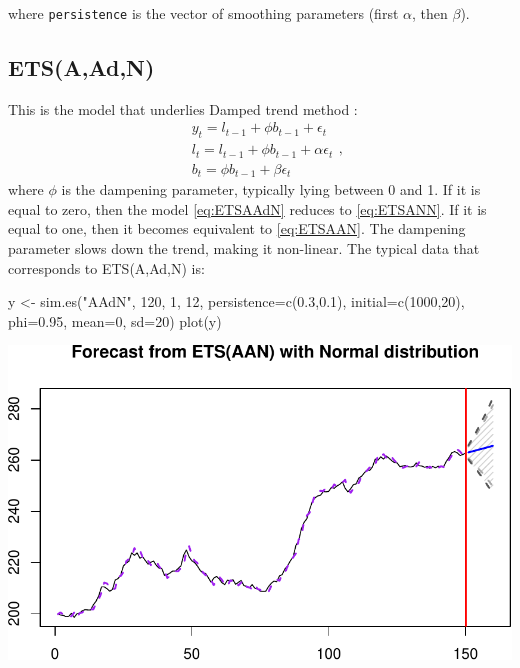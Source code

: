 \documentclass[
]{book}
\newenvironment{Shaded}{\begin{snugshade}}{\end{snugshade}}
\newcommand{\AttributeTok}[1]{\textcolor[rgb]{0.77,0.63,0.00}{#1}}
\newcommand{\DecValTok}[1]{\textcolor[rgb]{0.00,0.00,0.81}{#1}}
\newcommand{\FloatTok}[1]{\textcolor[rgb]{0.00,0.00,0.81}{#1}}
\newcommand{\FunctionTok}[1]{\textcolor[rgb]{0.00,0.00,0.00}{#1}}
\newcommand{\NormalTok}[1]{#1}
\newcommand{\OtherTok}[1]{\textcolor[rgb]{0.56,0.35,0.01}{#1}}
\newcommand{\StringTok}[1]{\textcolor[rgb]{0.31,0.60,0.02}{#1}}
\theoremstyle{definition}
\theoremstyle{definition}
\theoremstyle{definition}
\theoremstyle{definition}
\theoremstyle{remark}
\begin{document}
where \texttt{persistence} is the vector of smoothing parameters (first \(\alpha\), then \(\beta\)).

\hypertarget{ETSAAdN}{%
\subsection{ETS(A,Ad,N)}\label{ETSAAdN}}

This is the model that underlies Damped trend method \citep{Roberts1982}:
\begin{equation}
  \begin{aligned}
    & y_{t} = l_{t-1} + \phi b_{t-1} + \epsilon_t \\
    & l_t = l_{t-1} + \phi b_{t-1} + \alpha \epsilon_t \\
    & b_t = \phi b_{t-1} + \beta \epsilon_t
  \end{aligned} ,
  \label{eq:ETSAAdN}
\end{equation}
where \(\phi\) is the dampening parameter, typically lying between 0 and 1. If it is equal to zero, then the model \eqref{eq:ETSAAdN} reduces to \eqref{eq:ETSANN}. If it is equal to one, then it becomes equivalent to \eqref{eq:ETSAAN}. The dampening parameter slows down the trend, making it non-linear. The typical data that corresponds to ETS(A,Ad,N) is:

\begin{Shaded}
\begin{Highlighting}[]
\NormalTok{y }\OtherTok{\textless{}{-}} \FunctionTok{sim.es}\NormalTok{(}\StringTok{"AAdN"}\NormalTok{, }\DecValTok{120}\NormalTok{, }\DecValTok{1}\NormalTok{, }\DecValTok{12}\NormalTok{, }\AttributeTok{persistence=}\FunctionTok{c}\NormalTok{(}\FloatTok{0.3}\NormalTok{,}\FloatTok{0.1}\NormalTok{),}
            \AttributeTok{initial=}\FunctionTok{c}\NormalTok{(}\DecValTok{1000}\NormalTok{,}\DecValTok{20}\NormalTok{), }\AttributeTok{phi=}\FloatTok{0.95}\NormalTok{, }\AttributeTok{mean=}\DecValTok{0}\NormalTok{, }\AttributeTok{sd=}\DecValTok{20}\NormalTok{)}
\FunctionTok{plot}\NormalTok{(y)}
\end{Highlighting}
\end{Shaded}

\includegraphics{adam_files/figure-latex/unnamed-chunk-27-1.pdf}
\end{document}
